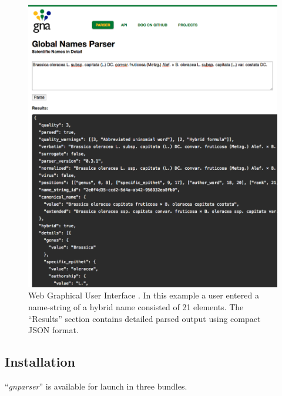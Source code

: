 \documentclass{bmcart}
\begin{document}
\begin{figure}[htbp]
  \begin{center}

    \caption{Web Graphical User Interface \cite{gnparser-web}. In this example
      a user entered a name-string of a hybrid name consisted of 21 elements.
      The ``Results'' section contains detailed parsed output using compact
      JSON format.}\label{figure:webgui}

    \vspace{5mm}
    \includegraphics[scale=0.35]{images/2.png}
  \end{center}
\end{figure}

\subsection*{Installation}

``\textit{gnparser}'' is available for launch in three bundles.
\end{document}
